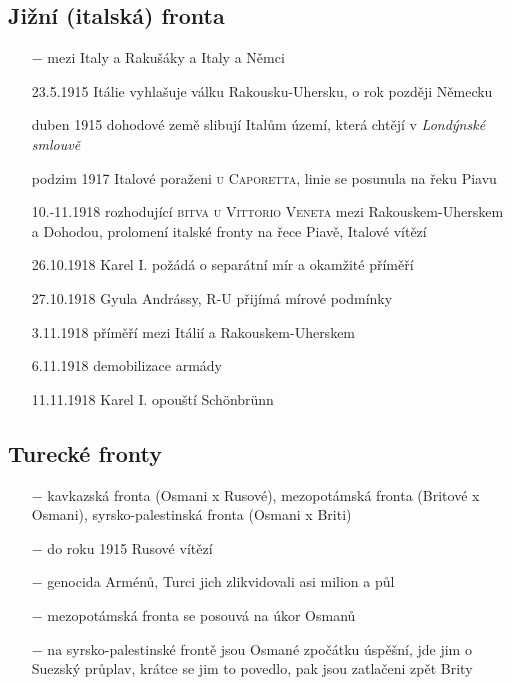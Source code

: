 \documentclass{article}
\begin{document}
\subsection*{Jižní (italská) fronta}
\begin{itemize}
    \vspace{-0.5em}
    \setlength\itemsep{0.15em}
    \item[$-$] mezi Italy a Rakušáky a Italy a Němci
    \item[23.5.1915] Itálie vyhlašuje válku Rakousku-Uhersku, o rok později Německu
    \item[duben 1915] dohodové země slibují Italům území, která chtějí v \textit{Londýnské smlouvě}
    \item[podzim 1917] Italové poraženi \textsc{u Caporetta}, linie se posunula na řeku Piavu
    \item[10.-11.1918] rozhodující \textsc{bitva u Vittorio Veneta} mezi Rakouskem-Uherskem a Dohodou, prolomení italské fronty na řece Piavě, Italové vítězí
    \item[26.10.1918] Karel I. požádá o separátní mír a okamžité příměří
    \item[27.10.1918]  Gyula Andrássy, R-U přijímá mírové podmínky
    \item[3.11.1918] příměří mezi Itálií a Rakouskem-Uherskem
    \item[6.11.1918] demobilizace armády
    \item[11.11.1918]  Karel I. opouští Schönbrünn
\end{itemize}

\subsection*{Turecké fronty}
\begin{itemize}
    \vspace{-0.5em}
    \setlength\itemsep{0.15em}
    \item[$-$] kavkazská fronta (Osmani x Rusové), mezopotámská fronta (Britové x Osmani), syrsko-palestinská fronta (Osmani x Briti)
    \item[$-$] do roku 1915 Rusové vítězí
    \item[$-$] genocida Arménů, Turci jich zlikvidovali asi milion a půl
    \item[$-$] mezopotámská fronta se posouvá na úkor Osmanů
    \item[$-$] na syrsko-palestinské frontě jsou Osmané zpočátku úspěšní, jde jim o Suezský průplav, krátce se jim to povedlo, pak jsou zatlačeni zpět Brity
\end{itemize}
\end{document}
